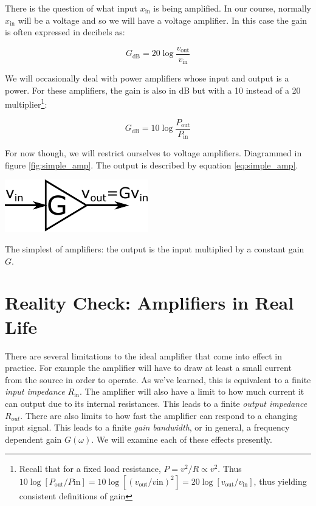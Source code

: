 \documentclass{tufte-book}
\begin{document}
There is the question of what input $x_\text{in}$ is being amplified. In our course, normally $x_\text{in}$ will be a voltage and so we will have a voltage amplifier. In this case the gain is often expressed in decibels as:

\begin{equation}
\label{eq:voltage_amp_dB}
G_\text{dB} = 20\log\frac{v_\text{out}}{v_\text{in}} 
\end{equation}

We will occasionally deal with power amplifiers whose input and output is a power. For these amplifiers, the gain is also in dB but with a 10 instead of a 20 multiplier\footnote{Recall that for a fixed load resistance, $P = v^2/R \propto v^2$. Thus $10\log\left[P_\text{out}/P\text{in}\right] = 10\log\left[\left(v_\text{out}/v\text{in}\right)^2\right] = 20\log\left[v_\text{out}/v_\text{in}\right]$, thus yielding consistent definitions of gain}:

\begin{equation}
\label{eq:power_amp_dB}
G_\text{dB} = 10\log\frac{P_\text{out}}{P_\text{in}} 
\end{equation}

\noindent For now though, we will restrict ourselves to voltage amplifiers. Diagrammed in figure \ref{fig:simple_amp}. The output is described by equation \ref{eq:simple_amp}.

\begin{marginfigure}%
  \includegraphics[width=\linewidth]{SimpleAmplifier}
  \caption{The simplest of amplifiers: the output is the input multiplied by a constant gain $G$.}
  \label{fig:simple_amp}
\end{marginfigure}

\section{Reality Check: Amplifiers in Real Life}
There are several limitations to the ideal amplifier that come into effect in practice. For example the amplifier will have to draw at least a small current from the source in order to operate. As we've learned, this is equivalent to a finite \textit{input impedance} $R_\text{in}$. The amplifier will also have a limit to how much current it can output due to its internal resistances. This leads to a finite \textit{output impedance} $R_{out}$. There are also limits to how fast the amplifier can respond to a changing input signal. This leads to a finite \textit{gain bandwidth}, or in general, a frequency dependent gain $G(\omega)$. We will examine each of these effects presently.
\end{document}
